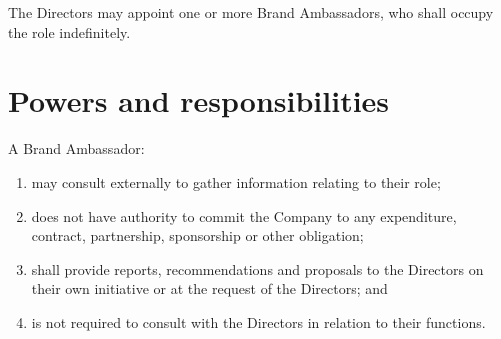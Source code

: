 \documentclass[a4paper,10pt]{article}
\renewcommand{\labelenumi}{(\arabic{enumi})}
\begin{document}
The Directors may appoint one or more Brand Ambassadors, who shall occupy the role indefinitely.

\section{Powers and responsibilities}

A Brand Ambassador:

\begin{enumerate}
    \renewcommand{\labelenumi}{(\alph{enumi})}
    \item may consult externally to gather information relating to their role;
    \item does not have authority to commit the Company to any expenditure, contract, partnership, sponsorship or other obligation;
    \item shall provide reports, recommendations and proposals to the Directors on their own initiative or at the request of the Directors; and
    \item is not required to consult with the Directors in relation to their functions.
\end{enumerate}
\end{document}
